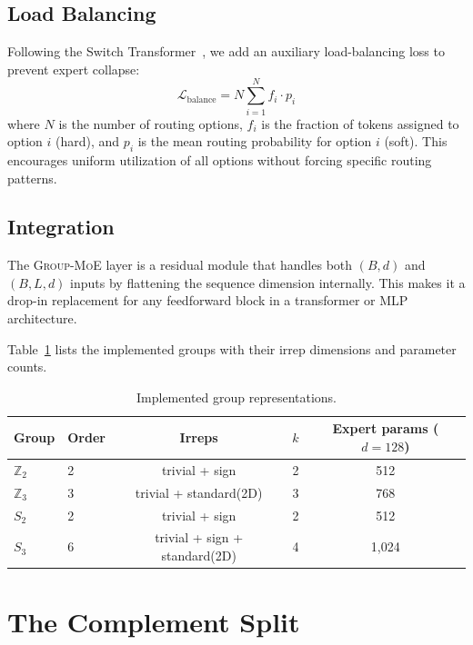 \documentclass[10pt, letterpaper]{article}
\newcommand{\gmoe}{\textsc{Group-MoE}}
\begin{document}
\subsection{Load Balancing}

Following the Switch Transformer~\cite{fedus2022switch}, we add an auxiliary load-balancing loss to prevent expert collapse:
\begin{equation}
    \mathcal{L}_{\text{balance}} = N \sum_{i=1}^{N} f_i \cdot p_i
\end{equation}
where $N$ is the number of routing options, $f_i$ is the fraction of tokens assigned to option $i$ (hard), and $p_i$ is the mean routing probability for option $i$ (soft). This encourages uniform utilization of all options without forcing specific routing patterns.

\subsection{Integration}

The \gmoe{} layer is a residual module that handles both $(B, d)$ and $(B, L, d)$ inputs by flattening the sequence dimension internally. This makes it a drop-in replacement for any feedforward block in a transformer or MLP architecture.

Table~\ref{tab:groups} lists the implemented groups with their irrep dimensions and parameter counts.

\begin{table}[h]
\centering
\caption{Implemented group representations.}
\label{tab:groups}
\begin{tabular}{llccc}
\toprule
Group & Order & Irreps & $k$ & Expert params ($d{=}128$) \\
\midrule
$\mathbb{Z}_2$ & 2 & trivial + sign & 2 & 512 \\
$\mathbb{Z}_3$ & 3 & trivial + standard(2D) & 3 & 768 \\
$S_2$ & 2 & trivial + sign & 2 & 512 \\
$S_3$ & 6 & trivial + sign + standard(2D) & 4 & 1,024 \\
\bottomrule
\end{tabular}
\end{table}

\section{The Complement Split}
\label{sec:complement}
\end{document}
